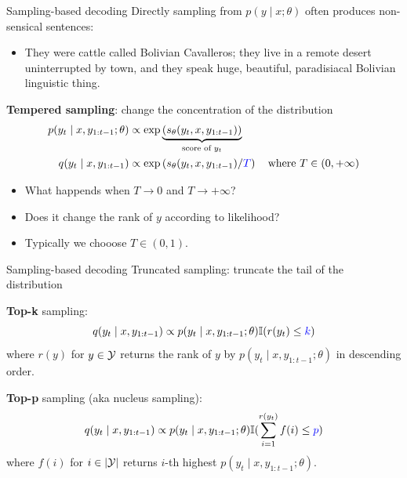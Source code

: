 \documentclass[usenames,dvipsnames,notes]{beamer}
\begin{document}
\begin{frame}
    {Sampling-based decoding}
    Directly sampling from $p(y\mid x; \theta)$ often produces non-sensical sentences:\\
    \begin{itemize}
        \item[] {\footnotesize They were cattle called Bolivian Cavalleros; they live in a remote desert uninterrupted by town, and they speak huge, beautiful, paradisiacal Bolivian linguistic thing.}
    \end{itemize}

    \textbf{Tempered sampling}: change the concentration of the distribution
    \begin{align*}
        p(y_t \mid x, y_{1:t-1}; \theta) &\propto \exp\underbrace{\left( s_\theta(y_t, x, y_{1:t-1}) \right)}_{\text{score of $y_t$}} \\
        q(y_t \mid x, y_{1:t-1}) &\propto \exp\left( s_\theta(y_t,x,y_{1:t-1})/{\color{blue}T} \right) 
        \quad \text{where } T\in(0, +\infty)
    \end{align*}
    \vspace{-2em}
    \begin{itemize}
        \item What happends when $T\to 0$ and $T\to +\infty$?
        \item Does it change the rank of $y$ according to likelihood?
        \item Typically we chooose $T\in (0, 1)$.
    \end{itemize}
\end{frame}

\begin{frame}
    {Sampling-based decoding}
    Truncated sampling: truncate the tail of the distribution
    \vspace{4em}

    \textbf{Top-k} sampling:
    \vspace{-0.5em}
    $$
    q(y_t \mid x, y_{1:t-1}) \propto p(y_t \mid x, y_{1:t-1}; \theta)\mathbb{I}(r(y_t)\le {\color{blue}k})
    $$
    where $r(y)$ for $y\in\mathcal{Y}$ returns the rank of $y$ by $p(y_t \mid x, y_{1:t-1}; \theta)$ in descending order.

    \textbf{Top-p} sampling (aka nucleus sampling):
    \vspace{-1em}
    $$
    q(y_t \mid x, y_{1:t-1}) \propto p(y_t \mid x, y_{1:t-1}; \theta)\mathbb{I}(\sum_{i=1}^{r(y_t)}f(i)\le {\color{blue}p})
    $$
    where $f(i)$ for $i\in|\mathcal{Y}|$ returns $i$-th highest $p(y_t \mid x, y_{1:t-1}; \theta)$.
\end{frame}
\end{document}
